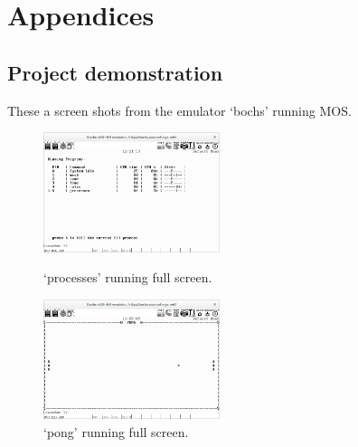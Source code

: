\documentclass[a4paper]{report}
\begin{document}
\chapter{Appendices}

\section{Project demonstration}

\label{sec:projdem}

These a screen shots from the emulator `bochs' running MOS.

\begin{figure}[ht]
\centering
\begin{minipage}{.5\textwidth}
  \centering
  \includegraphics[width=195px]{demoimages/processes}
  \caption{`processes' running full screen.}
  \label{fig:demo-processes}
\end{minipage}%
\begin{minipage}{.5\textwidth}
  \centering
  \includegraphics[width=195px]{demoimages/full-screen-pong}
  \caption{`pong' running full screen.}
  \label{fig:demo-pong}
\end{minipage}
\end{figure}
\end{document}
